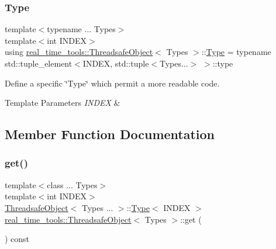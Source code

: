 \subsubsection{\texorpdfstring{Type}{Type}}
{\footnotesize\ttfamily template$<$typename ... Types$>$ \\
template$<$int I\+N\+D\+EX$>$ \\
using \hyperlink{classreal__time__tools_1_1ThreadsafeObject}{real\+\_\+time\+\_\+tools\+::\+Threadsafe\+Object}$<$ Types $>$\+::\hyperlink{classreal__time__tools_1_1ThreadsafeObject_afcbd77df1964d4fe606f1e776f1ff9b8}{Type} =  typename std\+::tuple\+\_\+element$<$I\+N\+D\+EX, std\+::tuple$<$Types...$>$ $>$\+::type}



Define a specific \char`\"{}\+Type\char`\"{} which permit a more readable code. 


\begin{DoxyTemplParams}{Template Parameters}
{\em I\+N\+D\+EX} & \\
\hline
\end{DoxyTemplParams}


\subsection{Member Function Documentation}
\mbox{\label{classreal__time__tools_1_1ThreadsafeObject_a866719911ad3b4b78c9abd1140862b7f}} 
\subsubsection{\texorpdfstring{get()}{get()}}
{\footnotesize\ttfamily template$<$class ... Types$>$ \\
template$<$int I\+N\+D\+EX$>$ \\
\hyperlink{classreal__time__tools_1_1ThreadsafeObject}{Threadsafe\+Object}$<$ Types ... $>$\+::\hyperlink{classreal__time__tools_1_1ThreadsafeObject_afcbd77df1964d4fe606f1e776f1ff9b8}{Type}$<$ I\+N\+D\+EX $>$ \hyperlink{classreal__time__tools_1_1ThreadsafeObject}{real\+\_\+time\+\_\+tools\+::\+Threadsafe\+Object}$<$ Types $>$\+::get (\begin{DoxyParamCaption}{ }\end{DoxyParamCaption}) const}



